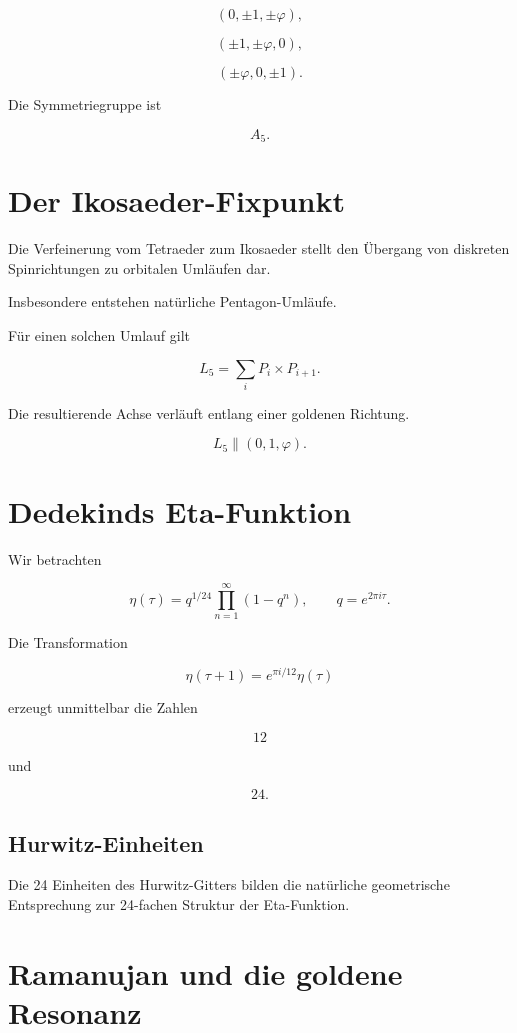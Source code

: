 \documentclass[11pt,a4paper]{article}
\begin{document}
	\[
	(0,\pm1,\pm\varphi),
	\]
	
	\[
	(\pm1,\pm\varphi,0),
	\]
	
	\[
	(\pm\varphi,0,\pm1).
	\]
	
	Die Symmetriegruppe ist
	
	\[
	A_5.
	\]
	
	\section{Der Ikosaeder-Fixpunkt}
	
	Die Verfeinerung vom Tetraeder zum Ikosaeder
	stellt den Übergang von diskreten
	Spinrichtungen zu orbitalen Umläufen dar.
	
	Insbesondere entstehen natürliche
	Pentagon-Umläufe.
	
	Für einen solchen Umlauf gilt
	
	\[
	L_5
	=
	\sum_i P_i\times P_{i+1}.
	\]
	
	Die resultierende Achse verläuft entlang einer
	goldenen Richtung.
	
	\[
	L_5
	\parallel
	(0,1,\varphi).
	\]
	
	\section{Dedekinds Eta-Funktion}
	
	Wir betrachten
	
	\[
	\eta(\tau)
	=
	q^{1/24}
	\prod_{n=1}^{\infty}(1-q^n),
	\qquad
	q=e^{2\pi i\tau}.
	\]
	
	Die Transformation
	
	\[
	\eta(\tau+1)
	=
	e^{\pi i/12}\eta(\tau)
	\]
	
	erzeugt unmittelbar die Zahlen
	
	\[
	12
	\]
	
	und
	
	\[
	24.
	\]
	
	\subsection{Hurwitz-Einheiten}
	
	Die 24 Einheiten des Hurwitz-Gitters
	bilden die natürliche geometrische Entsprechung
	zur 24-fachen Struktur der Eta-Funktion.
	
	\section{Ramanujan und die goldene Resonanz}
	
\end{document}
